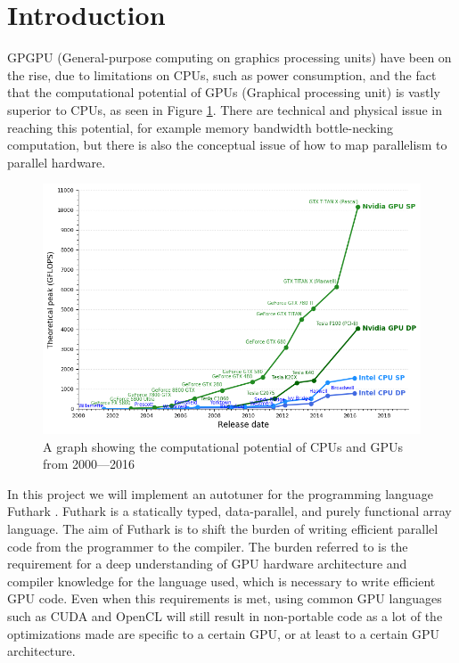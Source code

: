 \section{Introduction}
GPGPU (General-purpose computing on graphics processing units) have been on the
rise, due to limitations on CPUs, such as power consumption, and the fact
that the computational potential of GPUs (Graphical processing unit) is vastly
superior to CPUs, as seen in Figure \ref{potential}. There are technical and physical
issue in reaching this potential, for example memory bandwidth bottle-necking computation, but there is
also the conceptual issue of how to map parallelism to parallel hardware.
\begin{figure}[h]
	\centering
	\includegraphics[width=.8\textwidth]{resources/graf.png}
	\caption{A graph showing the computational potential of CPUs and GPUs from 2000---2016 \cite{cpu-vs-gpu}}
	\label{potential}
\end{figure}

In this project we will implement an autotuner for the programming language
Futhark \cite{futhark-home}. Futhark is a statically typed, data-parallel, and
purely functional array language. The aim of Futhark is to shift the burden of
writing efficient parallel code from the programmer to the compiler. The
burden referred to is the requirement for a deep understanding of GPU hardware architecture and compiler knowledge for the language used, which is necessary to write efficient GPU code. Even when this requirements is met, using common GPU languages such as CUDA and OpenCL will still result in non-portable code as a lot of the optimizations made
are specific to a certain GPU, or at least to a certain GPU architecture. 

